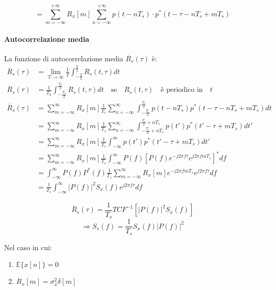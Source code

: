 \[
    = \sum_{m=-\infty}^{+\infty} R_x[m] \sum_{n=-\infty}^{+\infty} p(t - nT_s) \cdot p^*(t - \tau - nT_s + mT_s)
\]

\paragraph*{Autocorrelazione media}

La funzione di autocorrelazione media \( \overline{R}_s(\tau) \) è:
\begin{align*}
    \overline{R}_s(\tau) & = \lim_{T\to\infty} \frac{1}{T} \int_{-\frac{T}{2}}^{\frac{T}{2}} R_s(t, \tau) dt                                                                   \\
    \overline{R}_s(\tau) & = \frac{1}{T_0} \int_{-\frac{T_0}{2}}^{\frac{T_0}{2}} R_s(t,\tau)dt \quad \text{se} \quad R_s(t,\tau) \quad \text{è periodico in} \quad t           \\
    \overline{R}_s(\tau) & = \sum_{m=-\infty}^{\infty} R_x[m] \frac{1}{T_s} \sum_{n=-\infty}^{\infty} \int_{-\frac{T_s}{2}}^{\frac{T_s}{2}} p(t-nT_s)p^*(t-\tau-nT_s+mT_s)dt   \\
                         & = \sum_{m=-\infty}^{\infty} R_x[m] \frac{1}{T_s} \sum_{n=-\infty}^{\infty}\int_{-\frac{T_s}{2}+nT_s}^{\frac{T_s}{2}+nT_s} p(t')p^*(t'-\tau+mT_s)dt' \\
                         & = \sum_{m=-\infty}^{\infty} R_x[m] \frac{1}{T_s} \int_{-\infty}^{\infty} p(t')p^*(t'-\tau+mT_s)dt'                                                  \\
                         & = \sum_{m=-\infty}^{\infty} R_x[m] \frac{1}{T_s} \int_{-\infty}^{\infty} P(f)[P(f)e^{-j2\pi f\tau}e^{j2\pi fmT_s}]^*df                              \\
                         & = \int_{-\infty}^{\infty} P(f)P^*(f)\frac{1}{T_s} \sum_{m=-\infty}^{\infty} R_x[m] e^{-j2\pi fmT_s}e^{j2\pi f\tau}df                                \\
                         & = \frac{1}{T_s} \int_{-\infty}^{\infty} |P(f)|^2 S_x(f)e^{j2\pi f\tau}df
\end{align*}


\[
    \overline{R}_s(\tau) = \frac{1}{T_s} TCF^{-1} \left[ |P(f)|^2 S_x(f) \right]
\]
\[
    \Rightarrow S_s(f) = \frac{1}{T_s} S_x(f) |P(f)|^2
\]

Nel caso in cui:
\begin{enumerate}
    \item $\mathbb{E} \{ x[n] \} = 0$
    \item $R_x[m] = \sigma_x^2 \delta[m]$
\end{enumerate}


